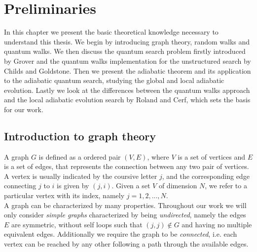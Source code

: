 \newcommand{\wvec}{\begin{pmatrix}1 \\ 0 \end{pmatrix}}
\newcommand{\svec}{{\begin{pmatrix}0 \\ 1 \end{pmatrix}}}
\newcommand{\kalpha}{\ket{\alpha}}
\newcommand{\kbeta}{\ket{\beta}}
\newcommand{\kpsi}{\ket{\psi}}




\newpage
\thispagestyle{empty}
\chapter{\textbf{Preliminaries}}\label{chapter one}
In this chapter we present the basic theoretical knowledge necessary to understand this thesis. We begin by introducing graph theory, random walks and quantum walks. We then discuss the quantum search problem firstly introduced by Grover and the quantum walks implementation for the unstructured search by Childs and Goldstone. Then we present the adiabatic theorem and its application to the adiabatic quantum search, studying the global and local adiabatic evolution. Lastly we look at the differences between the quantum walks approach and the local adiabatic evolution search by Roland and Cerf, which sets the basis for our work.

\section{Introduction to graph theory}\label{sec:introduction to graph theory}
A graph $G$ is defined as a ordered pair $(V,E)$, where $V$ is a set of vertices and $E$ is a set of edges, that represents the connection between any two pair of vertices. A vertex is usually indicated by the coursive letter $j$, and the corresponding edge connecting $j$ to $i$ is given by $(j,i)$. Given a set $V$ of dimension $N$, we refer to a particular vertex with its index, namely $j=1,2,...,N$.\\

\noindent
A graph can be characterized by many properties. Throughout our work we will only consider \textit{simple graphs} characterized by being \textit{undirected}, namely the edges $E$ are symmetric, without self loops such that $(j,j)\notin G$ and having no multiple equivalent edges. Additionally we require the graph to be \textit{connected}, i.e. each vertex can be reached by any other following a path through the available edges.


